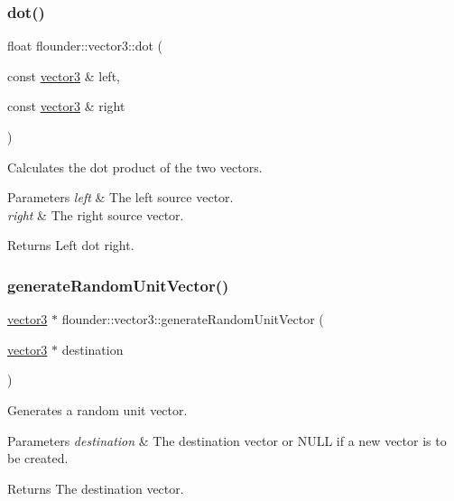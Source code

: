 \subsubsection{\texorpdfstring{dot()}{dot()}}
{\footnotesize\ttfamily float flounder\+::vector3\+::dot (\begin{DoxyParamCaption}\item[{const \hyperlink{classflounder_1_1vector3}{vector3} \&}]{left,  }\item[{const \hyperlink{classflounder_1_1vector3}{vector3} \&}]{right }\end{DoxyParamCaption})\hspace{0.3cm}{\ttfamily [static]}}



Calculates the dot product of the two vectors. 


\begin{DoxyParams}{Parameters}
{\em left} & The left source vector. \\
\hline
{\em right} & The right source vector. \\
\hline
\end{DoxyParams}
\begin{DoxyReturn}{Returns}
Left dot right. 
\end{DoxyReturn}
\mbox{\label{classflounder_1_1vector3_a6c8eeac56a831b4e3ca221e19f86031e}} 
\subsubsection{\texorpdfstring{generate\+Random\+Unit\+Vector()}{generateRandomUnitVector()}}
{\footnotesize\ttfamily \hyperlink{classflounder_1_1vector3}{vector3} $\ast$ flounder\+::vector3\+::generate\+Random\+Unit\+Vector (\begin{DoxyParamCaption}\item[{\hyperlink{classflounder_1_1vector3}{vector3} $\ast$}]{destination }\end{DoxyParamCaption})\hspace{0.3cm}{\ttfamily [static]}}



Generates a random unit vector. 


\begin{DoxyParams}{Parameters}
{\em destination} & The destination vector or N\+U\+LL if a new vector is to be created. \\
\hline
\end{DoxyParams}
\begin{DoxyReturn}{Returns}
The destination vector. 
\end{DoxyReturn}
\mbox{\label{classflounder_1_1vector3_a84374d3a1d99b2bcdcee65ade03e10c4}} 
